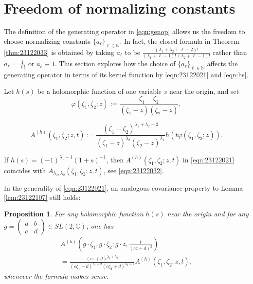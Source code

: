 \documentclass[12pt]{amsart}
\theoremstyle{plain} %
\newtheorem{proposition}{Proposition}%
\theoremstyle{definition} %
\theoremstyle{remark} %
\begin{document}
\section{Freedom of normalizing constants}

The definition of the generating operator in \eqref{eqn:genop}
 allows us the freedom to choose normalizing constants $\{a_{\ell}\}_{\ell \in {\mathbb{N}}}$.  
In fact, 
 the closed formula in Theorem \ref{thm:23122033}
 is obtained by taking $a_{\ell}$ to be 
 $\frac{(\lambda_1+ \lambda_2 + \ell-2)!}{(\lambda_1+ \ell-1)!\,(\lambda_2 + \ell-1)!}$
 rather than $a_{\ell}=\frac 1 {\ell !}$ or $a_{\ell} \equiv 1$.  
This section explores how the choice of $\{a_{\ell}\}_{\ell \in {\mathbb{N}}}$ 
 affects the generating operator 
 in terms of its kernel function
 by \eqref{eqn:23122021} and \eqref{eqn:hs}.  



Let $h(s)$ be a holomorphic function of one variable $s$ near the origin, 
 and set
\[
     \varphi(\zeta_1, \zeta_2; z)
     :=
     \frac{\zeta_1-\zeta_2}{(\zeta_1-z) (\zeta_2-z)},   
\]

\begin{equation}
\label{eqn:23122021}
 A^{(h)}(\zeta_1, \zeta_2;z,t)
:=
  \frac{(\zeta_1-\zeta_2)^{\lambda_1+\lambda_2-2}}{(\zeta_1-z)^{\lambda_2} (\zeta_2-z)^{\lambda_1}}
  h(t \varphi(\zeta_1, \zeta_2;z)).  
\end{equation}



If $h(s)=(-1)^{\lambda_1-1} (1+s)^{-1}$, 
 then 
$
  A^{(h)}(\zeta_1, \zeta_2;z,t)
$
 in \eqref{eqn:23122021}
 coincides with $A_{\lambda_1, \lambda_2}(\zeta_1, \zeta_2;z,t)$, 
 see \eqref{eqn:23122032}.  



In the generality of \eqref{eqn:23122021}, 
 an analogous covariance property
 to Lemma \ref{lem:23122107} still holds:

\begin{proposition}
\label{prop:23121932}
For any holomorphic function $h(s)$
 near the origin
 and for any $g = \begin{pmatrix} a & b \\ c & d\end{pmatrix} \in SL(2,{\mathbb{C}})$, 
 one has
\begin{multline*}
   A^{(h)}(g \cdot \zeta_1, g \cdot \zeta_2; g \cdot z,\frac{t}{(c z +d)^2})
\\
  =
  \frac{(c z +d)^{\lambda_1+\lambda_2}}
       {(c \zeta_1 +d)^{\lambda_1-2}(c \zeta_2 +d)^{\lambda_2-2}} 
  A^{(h)}(\zeta_1, \zeta_2;z,t), 
\end{multline*}
 whenever the formula makes sense.  
\end{proposition}
\end{document}
